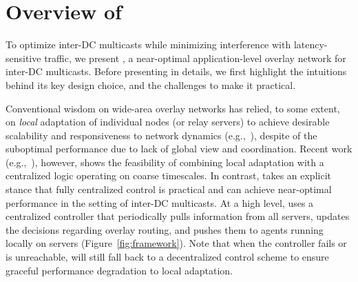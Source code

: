 \section{Overview of \name}
\label{sec:overview}

To optimize inter-DC multicasts while minimizing
interference with latency-sensitive traffic, we present {\em \name},
a near-optimal application-level overlay network for
inter-DC multicasts.
Before presenting \name in details,
we first highlight the intuitions behind its key
design choice, and the challenges to make it practical.







Conventional wisdom on wide-area overlay networks
has relied, to some extent,
on {\em local} adaptation of individual
nodes (or relay servers) to achieve desirable scalability
and responsiveness to network dynamics (e.g.,~\cite{Andreev2013Designing,Repantis2010Scaling,Huang2014A}),
despite of the suboptimal performance due to
lack of global view and coordination.
Recent work (e.g.,~\cite{mukerjee2014enabling}), however,
shows the feasibility of combining
local adaptation with a centralized logic operating
on coarse timescales.
In contrast, \name takes an explicit stance that
fully centralized control is practical and
can achieve near-optimal performance in
the setting of inter-DC multicasts.
At a high level,
\name uses a centralized controller that periodically pulls
information from all servers, updates the decisions regarding overlay
routing, and pushes them to agents running locally on servers
(Figure~\ref{fig:framework}).
Note that when the controller fails or is unreachable,
\name will still fall back to a decentralized control scheme
to ensure graceful performance degradation to
local adaptation.

